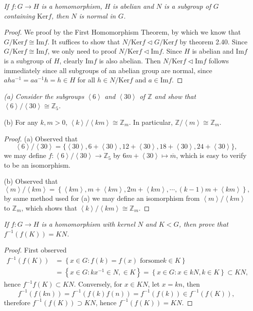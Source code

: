 \begin{problem}\em
If $f:G\to H$ is a homomorphism, $H$ is abelian and $N$ is a subgroup of $G$ containing $\mathrm{Ker}f$, then $N$ is normal in $G$.
\end{problem}
\begin{proof}
We proof by the First Homomorphism Theorem, by which we know that $G/\mathrm{Ker}f\cong\mathrm{Im}f$. It suffices to show that $N/\mathrm{Ker}f\lhd G/\mathrm{Ker}f$ by theorem 2.40. Since $G/\mathrm{Ker}f\cong\mathrm{Im}f$, we only need to proof $N/\mathrm{Ker}f\lhd\mathrm{Im}f$. Since $H$ is abelian and $\mathrm{Im}f$ is a subgroup of $H$, clearly $\mathrm{Im}f$ is also abelian. Then $N/\mathrm{Ker}f\lhd\mathrm{Im}f$ follows immediately since all subgroups of an abelian group are normal, since $aha^{-1}=aa^{-1}h=h\in H$ for all $h\in N/\mathrm{Ker}f$ and $a\in\mathrm{Im}f$.
\end{proof}
\begin{problem}\em
(a) Consider the subgroups $\left<6\right>$ and $\left<30\right>$ of $\mathbb{Z}$ and show that $\left<6\right>/\left<30\right>\cong\mathbb{Z}_5$.\par
(b) For any $k,m>0$, $\left<k\right>/\left<km\right>\cong\mathbb{Z}_m$. In particular, $\mathbb{Z}/\left<m\right>\cong\mathbb{Z}_m$.
\end{problem}
\begin{proof}
(a) Observed that 
$$\left<6\right>/\left<30\right>=\{\left<30\right>,6+\left<30\right>,12+\left<30\right>,18+\left<30\right>,24+\left<30\right>\},$$
we may define $f:\left<6\right>/\left<30\right>\to\mathbb{Z}_5$ by $6m+\left<30\right>\mapsto\overline{m}$, which is easy to verify to be an isomorphism.\par
(b) Observed that 
$$
\left< m \right> /\left< km \right> =\left\{ \left< km \right> ,m+\left< km \right> ,2m+\left< km \right> ,\cdots ,\left( k-1 \right) m+\left< km \right> \right\} ,
$$
by same method used for (a) we may define an isomorphism from $\left<m\right>/\left<km\right>$ to $\mathbb{Z}_m$, which shows that $\left<k\right>/\left<km\right>\cong\mathbb{Z}_m$.
\end{proof}
\begin{problem}\em
If $f:G\to H$ is a homomorphism with kernel $N$ and $K<G$, then prove that $f^{-1}(f(K))=KN$.
\end{problem}
\begin{proof}
First observed 
$$
\begin{aligned}
f^{-1}\left( f\left( K \right) \right) &=\left\{ x\in G:f\left( k \right) =f\left( x \right) \,\,\mathrm{for} \mathrm{some} k\in K \right\} 
\\
&=\left\{ x\in G:kx^{-1}\in N,\in K \right\} =\left\{ x\in G:x\in kN,k\in K \right\} \subset KN,
\end{aligned}
$$
hence $f^{-1}f(K)\subset KN$. Conversely, for $x\in KN$, let $x=kn$, then 
$$
f^{-1}\left( f\left( kn \right) \right) =f^{-1}\left( f\left( k \right) f\left( n \right) \right) =f^{-1}\left( f\left( k \right) \right) \in f^{-1}\left( f\left( K \right) \right) ,
$$
therefore $f^{-1}(f(K))\supset KN$, hence $f^{-1}(f(K))=KN$.
\end{proof}
